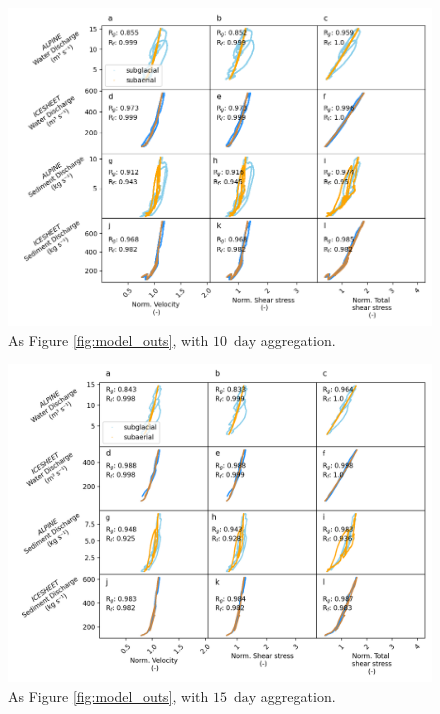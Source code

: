 \documentclass[11pt]{article}
\newcommand{\unit}[1]{$\mathrm{#1}$}
\begin{document}
\begin{center}
  \begin{figure}[h]
    \includegraphics[width=0.7\linewidth]{Fig3_10day.png}
    \caption{As Figure \ref{fig:model_outs}, with $10$ \,\unit{day} aggregation.} 
    \label{fig:model_outs_10day}
  \end{figure}
\end{center}
\begin{center}
  \begin{figure}[h]
    \includegraphics[width=0.7\linewidth]{Fig3_15day.png}
    \caption{As Figure \ref{fig:model_outs}, with $15$ \,\unit{day} aggregation.} 
    \label{fig:model_outs_15day}
  \end{figure}
\end{center}
\end{document}
